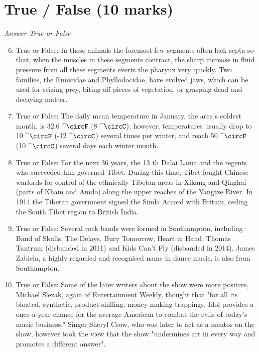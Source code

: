 \documentclass[12pt]{article}
\begin{document}
\section*{True / False (10 marks)}
\textit{Answer True or False}
\begin{enumerate}[label=\arabic*.]
\setcounter{enumi}{5}
\item True or False: In these animals the foremost few segments often lack septa so that, when the muscles in these segments contract, the sharp increase in fluid pressure from all these segments everts the pharynx very quickly. Two families, the Eunicidae and Phyllodocidae, have evolved jaws, which can be used for seizing prey, biting off pieces of vegetation, or grasping dead and decaying matter.
\item True or False: The daily mean temperature in January, the area's coldest month, is 32.6 ^\ensuremath{\circF} (8 ^\ensuremath{\circC}); however, temperatures usually drop to 10 ^\ensuremath{\circF} (-12 ^\ensuremath{\circC}) several times per winter, and reach 50 ^\ensuremath{\circF} (10 ^\ensuremath{\circC}) several days each winter month.
\item True or False: For the next 36 years, the 13 th Dalai Lama and the regents who succeeded him governed Tibet. During this time, Tibet fought Chinese warlords for control of the ethnically Tibetan areas in Xikang and Qinghai (parts of Kham and Amdo) along the upper reaches of the Yangtze River. In 1914 the Tibetan government signed the Simla Accord with Britain, ceding the South Tibet region to British India.
\item True or False: Several rock bands were formed in Southampton, including Band of Skulls, The Delays, Bury Tomorrow, Heart in Hand, Thomas Tantrum (disbanded in 2011) and Kids Can't Fly (disbanded in 2014). James Zabiela, a highly regarded and recognised name in dance music, is also from Southampton.
\item True or False: Some of the later writers about the show were more positive, Michael Slezak, again of Entertainment Weekly, thought that "for all its bloated, synthetic, product-shilling, money-making trappings, Idol provides a once-a-year chance for the average American to combat the evils of today's music business." Singer Sheryl Crow, who was later to act as a mentor on the show, however took the view that the show "undermines art in every way and promotes a different answer".
\end{enumerate}
\end{document}
